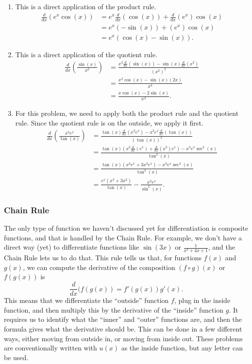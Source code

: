 \begin{exampleSol}
\begin{enumerate}
\item This is a direct application of the product rule.
\[ \begin{split}
\frac{d}{dx}\left( e^x \cos(x) \right) &= e^x \frac{d}{dx}\left(\cos(x)\right) + \frac{d}{dx}\left(e^x \right)\cos(x) \\
&= e^x (-\sin(x)) + (e^x) \cos(x) \\
&= e^x(\cos(x) - \sin(x)).
\end{split} \]
\item This is a direct application of the quotient rule.
\[ \begin{split}
\frac{d}{dx}\left(\frac{\sin(x)}{x^2}\right) &= \frac{x^2 \frac{d}{dx}\left(\sin(x)\right) - \sin(x) \frac{d}{dx}\left(x^2\right)}{(x^2)^2} \\
&= \frac{x^2 \cos(x) - \sin(x)(2x)}{x^4} \\
&= \frac{x\cos(x) - 2\sin(x)}{x^3}.
\end{split} \]
\item For this problem, we need to apply both the product rule and the quotient rule. Since the quotient rule is on the outside, we apply it first.
\[ \begin{split}
\frac{d}{dx}\left(\frac{x^3e^x}{\tan(x)}\right) &= \frac{\tan(x) \frac{d}{dx}\left(x^3e^x\right) - x^3e^x \frac{d}{dx}\left(\tan(x)\right)}{(\tan(x))^2} \\
&= \frac{\tan(x)\left(x^3 \frac{d}{dx}\left(e^x\right) + \frac{d}{dx}\left(x^3\right)e^x\right) - x^3e^x\sec^2(x)}{\tan^2(x)} \\
&= \frac{\tan(x) \left(x^3e^x + 3x^2e^x\right) - x^3e^x\sec^2(x)}{\tan^2(x)} \\
&= \frac{e^x(x^3 + 3x^2)}{\tan(x)} - \frac{x^3e^x}{\sin^2(x)}.
\end{split} \]
\end{enumerate}
\end{exampleSol}

\subsubsection{Chain Rule}

The only type of function we haven't discussed yet for differentiation is composite functions, and that is handled by the Chain Rule. For example, we don't have a direct way (yet) to differentiate functions like $\sin(3x)$ or $\frac{1}{x^3 + 4x + 1}$, and the Chain Rule lets us to do that. This rule tells us that, for functions $f(x)$ and $g(x)$, we can compute the derivative of the composition $(f \circ g)(x)$ or $f(g(x))$ is 
\[ \frac{d}{dx}(f(g(x)) = f'(g(x))g'(x). \] This means that we differentiate the ``outside'' function $f$, plug in the inside function, and then multiply this by the derivative of the ``inside'' function $g$.  It requires us to identify what the ``inner'' and ``outer'' functions are, and then the formula gives what the derivative should be. This can be done in a few different ways, either moving from outside in, or moving from inside out. These problems are conventionally written with $u(x)$ as the inside function, but any letter can be used.

